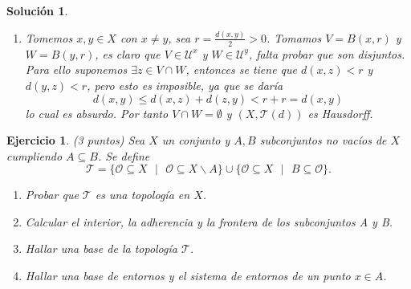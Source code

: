 \documentclass{article}
\theoremstyle{remark,bold} \newtheorem{exercise}{Ejercicio}
\newtheorem*{solution}{Solución}
\begin{document}
\begin{solution}
\begin{enumerate}
  \item Tomemos $x, y \in X$ con $x \neq y$, sea $r = \frac{d(x,
      y)}{2} > 0$. Tomamos $V = B(x, r)$ y $W = B(y, r)$, es claro que $V
    \in \mathcal{U}^x$ y $W \in \mathcal{U}^y$, falta probar que son
    disjuntos. Para ello suponemos $\exists z \in V \cap W$, entonces se
    tiene que $d(x, z) < r$ y $d(y, z) < r$, pero esto es imposible, ya
    que se daría \[d(x, y) \leqslant d(x, z) + d(z, y) < r + r = d(x, y)\]
    lo cual es absurdo. Por tanto $V \cap W = \emptyset$ y $(X,
    \mathcal{T}(d))$ es Hausdorff.
    
  \end{enumerate}

\end{solution}

\begin{exercise} (3 puntos) Sea $X$ un conjunto y $A, B$ subconjuntos
  no vacíos de $X$ cumpliendo $A \subseteq B$. Se define
  \[\mathcal{T} = \{\mathcal{O} \subseteq X \text{ } | \text{ }
    \mathcal{O} \subseteq X \backslash A\} \cup \{\mathcal{O} \subseteq X
    \text{ } | \text{ } B \subseteq \mathcal{O}\}.\]
  
  \begin{enumerate}
    
  \item Probar que $\mathcal{T}$ es una topología en $X$.
    
  \item Calcular el interior, la adherencia y la frontera de los
    subconjuntos A y B.
    
  \item Hallar una base de la topología $\mathcal{T}$.

  \item Hallar una base de entornos y el sistema de entornos de un
    punto $x \in A$.
    
  \end{enumerate}
  
\end{exercise}
\end{document}
